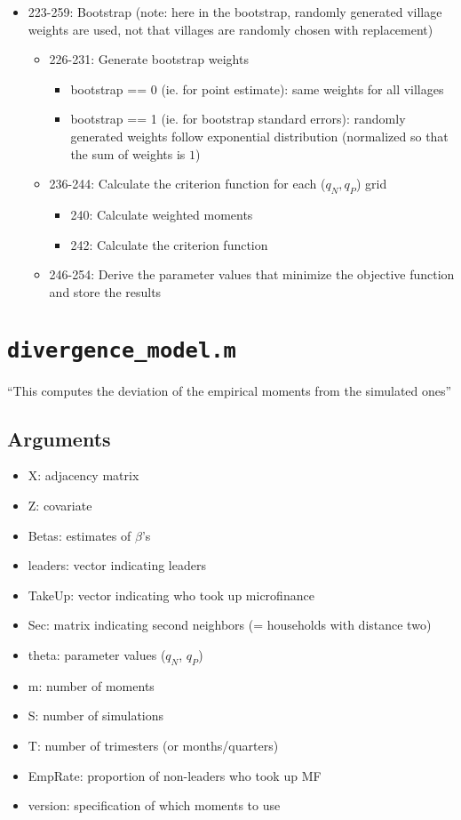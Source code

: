 \documentclass[10pt,letterpaper]{article}
\begin{document}
\begin{itemize}
  \item 223-259: Bootstrap (note: here in the bootstrap, randomly generated village weights are used, not that villages are randomly chosen with replacement)
    \begin{itemize}
      \item 226-231: Generate bootstrap weights 
        \begin{itemize}
          \item bootstrap == 0 (ie. for point estimate): same weights for all villages
          \item bootstrap == 1 (ie. for bootstrap standard errors): randomly generated weights follow exponential distribution (normalized so that the sum of weights is $1$)
        \end{itemize}
      \item 236-244: Calculate the criterion function for each ($q_N, q_P$) grid
        \begin{itemize}
          \item 240: Calculate weighted moments 
          \item 242: Calculate the criterion function
        \end{itemize}
      \item 246-254: Derive the parameter values that minimize the objective function and store the results
    \end{itemize}
\end{itemize}


\section{\texttt{divergence\_model.m}}\label{divergence_model}

``This computes the deviation of the empirical moments from the simulated ones''

\subsection*{Arguments}
\begin{itemize}
  \item X: adjacency matrix
  \item Z: covariate
  \item Betas: estimates of $\beta$'s 
  \item leaders: vector indicating leaders
  \item TakeUp: vector indicating who took up microfinance
  \item Sec: matrix indicating second neighbors (= households with distance two)
  \item theta: parameter values ($q_N$, $q_P$)
  \item m: number of moments
  \item S: number of simulations
  \item T: number of trimesters (or months/quarters)
  \item EmpRate: proportion of non-leaders who took up MF
  \item version: specification of which moments to use
\end{itemize}
\end{document}
